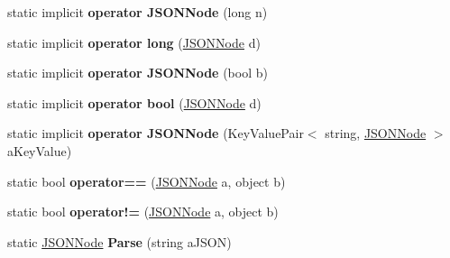 \begin{DoxyCompactItemize}
\item 
static implicit {\bfseries operator J\+S\+O\+N\+Node} (long n)\hypertarget{classSimpleJSON_1_1JSONNode_a0ef89c941874052a05afbf5453136eb2}{}\label{classSimpleJSON_1_1JSONNode_a0ef89c941874052a05afbf5453136eb2}

\item 
static implicit {\bfseries operator long} (\hyperlink{classSimpleJSON_1_1JSONNode}{J\+S\+O\+N\+Node} d)\hypertarget{classSimpleJSON_1_1JSONNode_ad4276cbe207ea51e47fd77cdb0dbf72b}{}\label{classSimpleJSON_1_1JSONNode_ad4276cbe207ea51e47fd77cdb0dbf72b}

\item 
static implicit {\bfseries operator J\+S\+O\+N\+Node} (bool b)\hypertarget{classSimpleJSON_1_1JSONNode_a9484661cba83e1b8ea8a1b97d8006496}{}\label{classSimpleJSON_1_1JSONNode_a9484661cba83e1b8ea8a1b97d8006496}

\item 
static implicit {\bfseries operator bool} (\hyperlink{classSimpleJSON_1_1JSONNode}{J\+S\+O\+N\+Node} d)\hypertarget{classSimpleJSON_1_1JSONNode_a8c1adc2153f3bfc6158f823e50ab3c4d}{}\label{classSimpleJSON_1_1JSONNode_a8c1adc2153f3bfc6158f823e50ab3c4d}

\item 
static implicit {\bfseries operator J\+S\+O\+N\+Node} (Key\+Value\+Pair$<$ string, \hyperlink{classSimpleJSON_1_1JSONNode}{J\+S\+O\+N\+Node} $>$ a\+Key\+Value)\hypertarget{classSimpleJSON_1_1JSONNode_a1e4d1b859f923aa72d95a52788e09419}{}\label{classSimpleJSON_1_1JSONNode_a1e4d1b859f923aa72d95a52788e09419}

\item 
static bool {\bfseries operator==} (\hyperlink{classSimpleJSON_1_1JSONNode}{J\+S\+O\+N\+Node} a, object b)\hypertarget{classSimpleJSON_1_1JSONNode_a6103dd81602c40f06a33895b669d2195}{}\label{classSimpleJSON_1_1JSONNode_a6103dd81602c40f06a33895b669d2195}

\item 
static bool {\bfseries operator!=} (\hyperlink{classSimpleJSON_1_1JSONNode}{J\+S\+O\+N\+Node} a, object b)\hypertarget{classSimpleJSON_1_1JSONNode_a804be147249a3e8689fd84842708fb48}{}\label{classSimpleJSON_1_1JSONNode_a804be147249a3e8689fd84842708fb48}

\item 
static \hyperlink{classSimpleJSON_1_1JSONNode}{J\+S\+O\+N\+Node} {\bfseries Parse} (string a\+J\+S\+ON)\hypertarget{classSimpleJSON_1_1JSONNode_af4f82de403afd2df381137972ded5981}{}\label{classSimpleJSON_1_1JSONNode_af4f82de403afd2df381137972ded5981}


\end{DoxyCompactItemize}
